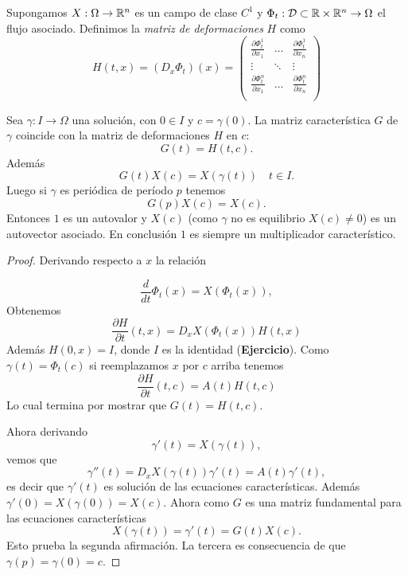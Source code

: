 \begin{definicion}{}Supongamos
  $X:\Omega\to\mathbb{R}^n$ es un campo de clase $C^1$ y $\Phi_t:\mathcal{D}\subset\mathbb{R}\times\mathbb{R}^n\to\Omega$ el flujo asociado. 
 Definimos la \emph{matriz de deformaciones} $H$ como 
 \[H(t,x)=(D_x\Phi_t)(x)=\begin{pmatrix}
                        \frac{\partial\Phi^1_t}{\partial x_1 } &\dots & \frac{\partial\Phi^1_t}{\partial x_n}\\
                        \vdots  & \ddots & \vdots\\
                        \frac{\partial\Phi^n_t}{\partial x_1 }& \dots &\frac{\partial\Phi^n_t}{\partial x_n }\\ 
                       \end{pmatrix}
\]
\end{definicion}






 

\begin{teorema}{}Sea $\gamma:I\to\Omega$ una solución, con $0\in I$ y $c=\gamma(0)$. La matriz característica 
$G$ de $\gamma$ coincide con la matriz de deformaciones $H$ en $c$:
\[G(t)=H(t,c).\]
Además
\[G(t)X(c)=X(\gamma(t))\quad t\in I.\]
Luego si $\gamma$ es periódica de período $p$ tenemos
\[G(p)X(c)=X(c).\]
Entonces $1$ es un autovalor y $X(c)$ (como $\gamma$ no es equilibrio $X(c)\neq 0$) es un autovector asociado.
En conclusión $1$ es siempre un multiplicador característico.
 
\end{teorema}



\begin{proof}
 Derivando respecto a $x$ la relación

\[\frac{d}{dt}\Phi_t(x)=X(\Phi_t(x)),\]
Obtenemos
\[\frac{\partial H}{\partial t}(t,x)=D_xX(\Phi_t(x))H(t,x)\]
Además $H(0,x)=I$, donde $I$ es la identidad (\textbf{Ejercicio}). Como $\gamma(t)=\Phi_t(c)$ si reemplazamos $x$
por $c$ arriba tenemos 
\[
 \frac{\partial H}{\partial t}(t,c)=A(t)H(t,c)
\]
Lo cual termina por mostrar que $G(t)=H(t,c)$. 


 Ahora derivando
 \[\gamma'(t)=X(\gamma(t)),\]
 vemos que
  \[\gamma''(t)=D_xX(\gamma(t))\gamma'(t)=A(t)\gamma'(t),\]
  es decir que $\gamma'(t)$ es solución de las ecuaciones características. Además $\gamma'(0)=X(\gamma(0))=X(c)$. 
  Ahora como $G$ es una matriz fundamental para las ecuaciones características
  \[X(\gamma(t))=\gamma'(t)=G(t)X(c).\]
  Esto prueba la segunda afirmación. La tercera es consecuencia de que $\gamma(p)=\gamma(0)=c$.
\end{proof}


